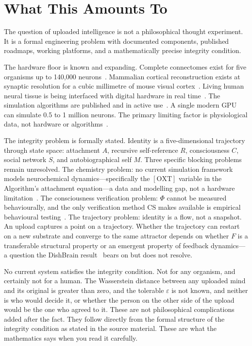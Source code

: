 \documentclass[12pt, a4paper]{article}
\begin{document}
\section{What This Amounts To}

The question of uploaded intelligence is not a philosophical thought experiment. It is a formal
engineering problem with documented components, published roadmaps, working platforms, and a
mathematically precise integrity condition.

The hardware floor is known and expanding. Complete connectomes exist for five organisms up to
140,000 neurons~\cite{Bio-3}. Mammalian cortical reconstruction exists at synaptic resolution for a
cubic millimetre of mouse visual cortex~\cite{Bio-4}. Living human neural tissue is being interfaced
with digital hardware in real time~\cite{Bio-5,Bio-6}. The simulation algorithms are published and in
active use~\cite{Bio-9,Bio-10}. A single modern GPU can simulate 0.5 to 1 million neurons. The
primary limiting factor is physiological data, not hardware or algorithms~\cite{Bio-8}.

The integrity problem is formally stated. Identity is a five-dimensional trajectory through state
space: attachment $A$, recursive self-reference $R$, consciousness $C$, social network $S$, and
autobiographical self $M$. Three specific blocking problems remain unresolved. The chemistry problem:
no current simulation framework models neurochemical dynamics---specifically the $[\mathrm{OXT}]$
variable in the Algorithm's attachment equation---a data and modelling gap, not a hardware
limitation~\cite{Bio-7}. The consciousness verification problem: $\Phi$ cannot be measured
behaviourally, and the only verification method CS makes available is empirical behavioural
testing~\cite{CS-6}. The trajectory problem: identity is a flow, not a snapshot. An upload captures
a point on a trajectory. Whether the trajectory can restart on a new substrate and converge to the
same attractor depends on whether $F$ is a transferable structural property or an emergent property of
feedback dynamics---a question the DishBrain result~\cite{Bio-6,Bor-9} bears on but does not
resolve.

No current system satisfies the integrity condition. Not for any organism, and certainly not for a
human. The Wasserstein distance between any uploaded mind and its original is greater than zero, and
the tolerable $\varepsilon$ is not known, and neither is who would decide it, or whether the person
on the other side of the upload would be the one who agreed to it. These are not philosophical
complications added after the fact. They follow directly from the formal structure of the integrity
condition as stated in the source material. These are what the mathematics says when you read it
carefully.
\end{document}
